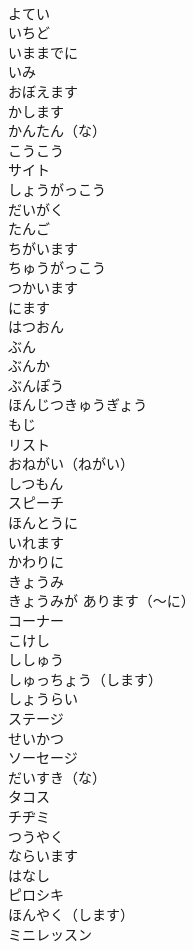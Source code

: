 \documentclass[8pt]{extreport}
\begin{document}
\begin{CJK}{UTF8}{min}
\\	よてい	
\\	いちど	
\\	いままでに	
\\	いみ	
\\	おぼえます	
\\	かします	
\\	かんたん（な）	
\\	こうこう	
\\	サイト	
\\	しょうがっこう	
\\	だいがく	
\\	たんご	
\\	ちがいます	
\\	ちゅうがっこう	
\\	つかいます	
\\	にます	
\\	はつおん	
\\	ぶん	
\\	ぶんか	
\\	ぶんぽう	
\\	ほんじつきゅうぎょう	
\\	もじ	
\\	リスト	
\\	おねがい（ねがい）	
\\	しつもん	
\\	スピーチ	
\\	ほんとうに	
\\	いれます	
\\	かわりに	
\\	きょうみ	
\\	きょうみが あります（～に）	
\\	コーナー	
\\	こけし	
\\	ししゅう	
\\	しゅっちょう（します）	
\\	しょうらい	
\\	ステージ	
\\	せいかつ	
\\	ソーセージ	
\\	だいすき（な）	
\\	タコス	
\\	チヂミ	
\\	つうやく	
\\	ならいます	
\\	はなし	
\\	ピロシキ	
\\	ほんやく（します）	
\\	ミニレッスン	

\end{CJK}
\end{document}
